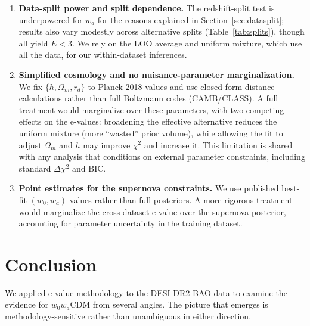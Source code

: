 \documentclass[11pt,a4paper]{article}
\begin{document}
\begin{enumerate}
    \item \textbf{Data-split power and split dependence.} The redshift-split test is underpowered for $w_a$ for the reasons explained in Section~\ref{sec:datasplit}; results also vary modestly across alternative splits (Table~\ref{tab:splits}), though all yield $E < 3$. We rely on the LOO average and uniform mixture, which use all the data, for our within-dataset inferences.

    \item \textbf{Simplified cosmology and no nuisance-parameter marginalization.} We fix $\{h, \Omega_m, r_d\}$ to Planck 2018 values and use closed-form distance calculations rather than full Boltzmann codes (CAMB/CLASS). A full treatment would marginalize over these parameters, with two competing effects on the e-values: broadening the effective alternative reduces the uniform mixture (more ``wasted'' prior volume), while allowing the fit to adjust $\Omega_m$ and $h$ may improve $\chi^2$ and increase it. This limitation is shared with any analysis that conditions on external parameter constraints, including standard $\Delta\chi^2$ and BIC.

    \item \textbf{Point estimates for the supernova constraints.} We use published best-fit $(w_0, w_a)$ values rather than full posteriors. A more rigorous treatment would marginalize the cross-dataset e-value over the supernova posterior, accounting for parameter uncertainty in the training dataset.
\end{enumerate}

\section{Conclusion}
\label{sec:conclusion}

We applied e-value methodology to the DESI DR2 BAO data to examine the evidence for $w_0w_a$CDM from several angles. The picture that emerges is methodology-sensitive rather than unambiguous in either direction.
\end{document}
